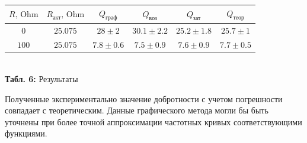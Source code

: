 \documentclass[12pt,a4paper]{scrartcl}
\begin{document}
	\begin{center}
		\begin{tabular}{|c|c|c|c|c|c|} \hline
			$R,\, \mathrm{Ohm}$ & $R_\text{акт},\, \mathrm{Ohm}$ & $Q_\text{граф}$ & $Q_\text{воз}$ & $Q_\text{зат}$ & $Q_\text{теор}$ \\\hline
			$0$ & $25.075$ & $28 \pm 2$ & $30.1 \pm 2.2$ & $25.2 \pm 1.8$ & $25.7 \pm 1$ \\\hline
			$100$ & $25.075$ & $7.8 \pm 0.6$ & $7.5 \pm 0.9$ & $7.6 \pm 0.9$ & $7.7 \pm 0.5$ \\\hline 
		\end{tabular}
		\\\textbf{Табл. 6:} Результаты
	\end{center}

	Полученные экспериментально значение добротности с учетом погрешности совпадает с теоретическим. Данные графического метода могли бы быть уточнены при более точной аппроксимации частотных кривых соответствующими функциями.
	
\end{document}
